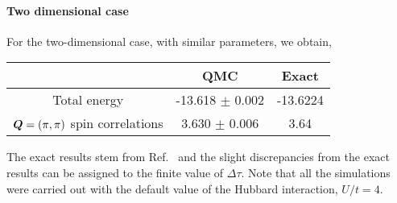\paragraph*{Two dimensional case}  
For the two-dimensional case,   with similar parameters, we obtain, \\
\begin{center}
\begin{tabular}{|c|c|c|}
\hline
                  &   QMC  & Exact  \\ \hline
Total energy & -13.618   $\pm $  0.002 &  -13.6224  \\ \hline
 $\boldsymbol{Q}=(\pi,\pi)$ spin correlations &  3.630     $ \pm $   0.006     & 3.64 \\ 
 \hline 
\end{tabular}
 \end{center}
 The exact results stem from Ref.~\cite{Parola91}     and the slight discrepancies from the exact results can be  assigned to the finite value of $\Delta \tau$.  Note that all the simulations were carried out with the default value of the Hubbard interaction, $U/t =4$. 
